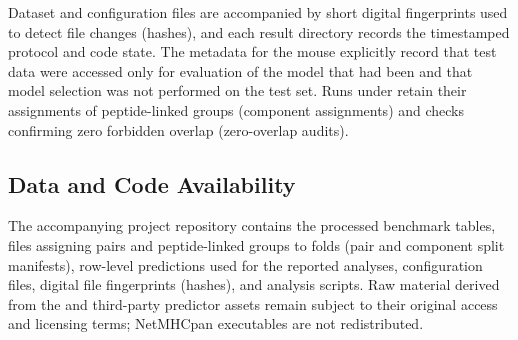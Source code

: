 Dataset and configuration files are accompanied by short digital fingerprints used to detect file changes (hashes), and each result directory records the timestamped protocol and code state. The metadata for the mouse \plainFixedTest{} explicitly record that test data were accessed only for evaluation of the model that had been \plainFrozen{} and that model selection was not performed on the test set. Runs under \plainPeptideOOF{} retain their assignments of peptide-linked groups (component assignments) and checks confirming zero forbidden overlap (zero-overlap audits).

\subsection{Data and Code Availability}

The accompanying project repository contains the processed benchmark tables, files assigning pairs and peptide-linked groups to folds (pair and component split manifests), row-level predictions used for the reported analyses, configuration files, digital file fingerprints (hashes), and analysis scripts. Raw material derived from the \plainIEDB{} and third-party predictor assets remain subject to their original access and licensing terms; NetMHCpan executables are not redistributed.
